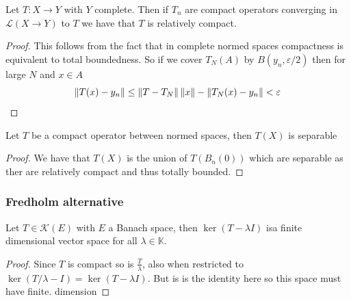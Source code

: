 \documentclass[
    a4paper,
    DIV=14,
    abstract=true,
    numbers=noenddot
]{scrartcl}
\begin{document}
\begin{proposition}
	Let $T:X\to Y$ with $Y$ complete. Then if $T_n$ are compact operators converging in $\mathcal{L}(X\to Y)$ to $T$ we have that $T$ is relatively compact.
\end{proposition}
\begin{proof}
	This follows from the fact that in complete normed spaces compactness is equivalent to total boundedness. So if we cover $T_N(A)$ by $B(y_n,\varepsilon/2)$ then for large $N$ and $x\in A$
	\begin{equation*}
		\left\lVert T(x)-y_n \right\rVert\leq \left\lVert T-T_N \right\rVert\left\lVert x \right\rVert-\left\lVert T_N(x)-y_n \right\rVert<\varepsilon
	\end{equation*}
\end{proof}
\begin{proposition}
	Let $T$ be a compact operator between normed spaces, then $T(X)$ is separable
\end{proposition}
\begin{proof}
	We have that $T(X)$ is the union of $T(B_n(0))$ which are separable as ther are relatively compact and thus totally bounded.
\end{proof}
\subsubsection{Fredholm alternative}
\begin{proposition}
	Let $T\in\mathcal{K}(E)$ with $E$ a Banach space, then $\ker(T-\lambda I)$ isa finite dimensional vector space for all $\lambda\in\mathbb{K}$.
\end{proposition}
\begin{proof}
	Since $T$ is compact so is $\frac{T}{\lambda}$, also when restricted to $\ker(T/\lambda-I)=\ker(T-\lambda I)$. But is is the identity here so this space must have finite. dimension
\end{proof}
\end{document}
